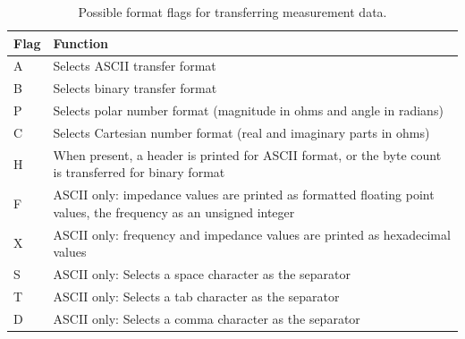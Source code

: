\begin{table}[htpb]
  \caption{Possible format flags for transferring measurement data.}
  \centering
  \begin{tabular}{>{\ttfamily\bgroup}l<{\egroup}|p{10cm}}
    Flag  & Function \\ \hline
    A     & Selects ASCII transfer format \\
    B     & Selects binary transfer format \\ \hline
    P     & Selects polar number format (magnitude in ohms and angle in radians) \\
    C     & Selects Cartesian number format (real and imaginary parts in ohms) \\ \hline
    H     & When present, a header is printed for ASCII format, or the byte count is transferred for binary format \\ \hline
    F     & ASCII only: impedance values are printed as formatted floating point values, the frequency as an unsigned integer \\
    X     & ASCII only: frequency and impedance values are printed as hexadecimal values \\ \hline
    S     & ASCII only: Selects a space character as the separator \\
    T     & ASCII only: Selects a tab character as the separator \\
    D     & ASCII only: Selects a comma character as the separator
  \end{tabular}
  \label{tab:format_flags}
\end{table}
